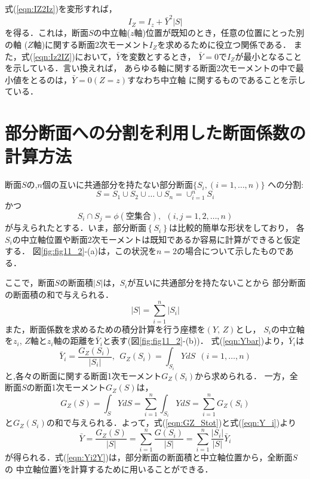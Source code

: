 \documentclass[10pt,a4j]{jbook}
\begin{document}
式(\ref{eqn:IZ2Iz})を変形すれば，
\begin{equation}
	I_Z=I_z+\bar Y^2 \left| S \right|
	\label{eqn:Iz2IZ}
\end{equation}
を得る．これは，断面$S$の中立軸($z$軸)位置が既知のとき，任意の位置にとった別の軸
($Z$軸)に関する断面2次モーメント$I_Z$を求めるために役立つ関係である．
また，式(\ref{eqn:Iz2IZ})において，$\bar{Y}$を変数とするとき，
$\bar{Y}=0$で$I_Z$が最小となることを示している．言い換えれば，
あらゆる軸に関する断面2次モーメントの中で最小値をとるのは，$\bar Y=0 (Z=z)$すなわち中立軸
に関するものであることを示している．
\section{部分断面への分割を利用した断面係数の計算方法}
断面$S$の,$n$個の互いに共通部分を持たない部分断面$\{ S_i, (i=1,\dots, n)\}$
への分割:
\begin{equation}
	S=S_1\cup S_2 \cup \dots \cup S_n=\cup_{i=1}^n S_i
	\label{eqn:cup_Si}
\end{equation}
かつ
\begin{equation}
	S_i \cap S_j =\phi(空集合), \ \ (i,j=1,2,\dots ,n ) 
	\label{eqn:cap_Si}
\end{equation}
が与えられたとする．いま，部分断面$\left\{ S_i \right\}$は比較的簡単な形状をしており，
各$S_i$の中立軸位置や断面2次モーメントは既知であるか容易に計算ができると仮定する．
図\ref{fig:fig11_2}-(a)は，この状況を$n=2$の場合について示したものである．


ここで，断面$S$の断面積$\left| S \right|$は，$S_i$が互いに共通部分を持たないことから
部分断面の断面積の和で与えられる．
\begin{equation}
	\left|S\right| = \sum_{i=1}^n \left| S_i \right|
	\label{eqn:Stot}
\end{equation}
また，断面係数を求めるための積分計算を行う座標を$(Y,\,Z)$とし，
$S_i$の中立軸を$z_i$, $Z$軸と$z_i$軸の距離を$\bar Y_i$と表す(図\ref{fig:fig11_2}-(b))．
式(\ref{eqn:Ybar})より，$\bar Y_i$は
\begin{equation}
	\bar{Y}_i = \frac{G_Z(S_i)}{\left| S_i \right|}, 
	\ \ G_Z(S_i)=\int_{S_i}YdS
\ \ (i=1,\dots,n)
	\label{eqn:Y_i}
\end{equation}
と,各々の断面に関する断面1次モーメント$G_Z(S_i)$から求められる．
一方，全断面$S$の断面1次モーメント$G_Z(S)$は，
\begin{equation}
	G_Z(S)=\int_SYdS
	=\sum_{i=1}^n \int_{S_i} YdS
	=\sum_{i=1}^n G_Z(S_i)
	\label{eqn:GZ_Stot}
\end{equation}
と$G_Z(S_i)$の和で与えられる．よって，式(\ref{eqn:GZ_Stot})と式(\ref{eqn:Y_i})より
\begin{equation}
	\bar Y 
	= \frac{G_Z(S)}{\left| S \right|}
	= \sum_{i=1}^n \frac{G(S_i)}{\left| S \right|}
	= \sum_{i=1}^n \frac{\left| S_i\right|}{\left| S \right|}\bar{Y}_i
	\label{eqn:Yi2Y}
\end{equation}
が得られる．式(\ref{eqn:Yi2Y})は，部分断面の断面積と中立軸位置から，全断面$S$の
中立軸位置$\bar Y$を計算するために用いることができる．
\end{document}
